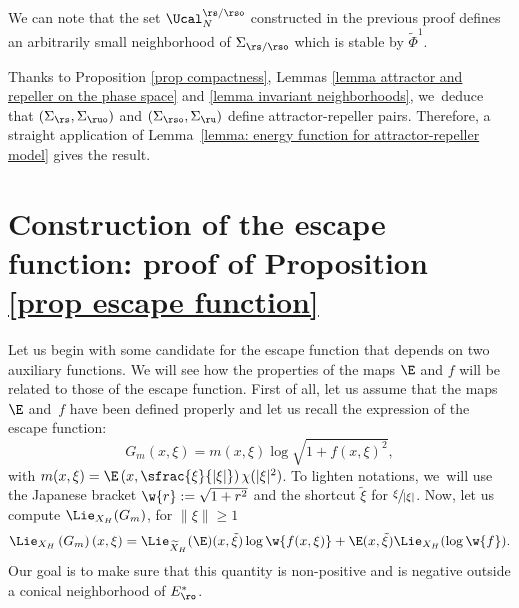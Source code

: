 \begin{remark}
We can note that the set $\Ucal_N^{\rs/\rso}$ constructed in the previous proof defines an arbitrarily small neighborhood of $\Sigma_{\rs/\rso}$ which is stable by $\widetilde{\Phi}^1$.
\end{remark}

\label{subsection: Proof energy functions for the Hamiltonian flow}

Thanks to Proposition \ref{prop compactness}, Lemmas \ref{lemma attractor and repeller on the phase space} and \ref{lemma invariant neighborhoods}, we~deduce that $(\Sigma_{\rs},\Sigma_{\ruo})$ and $(\Sigma_{\rso},\Sigma_{\ru})$ define attractor-repeller pairs. Therefore, a straight application of Lemma~\ref{lemma: energy function for attractor-repeller model} gives the result.

\section{Construction of the escape function: proof of Proposition \ref{prop escape function}}\label{section: Proof of escape function}

Let us begin with some candidate for the escape function that depends on two auxiliary functions. We will see how the properties of the maps $\E$ and $f$ will be related to those of the escape function. First of all, let us assume that the maps~$\E$ and~$f$ have been defined properly and let us recall the expression of the escape function:
\[
G_m (x,\xi) = m(x,\xi) \log \sqrt{1 + f(x,\xi)^2},
\]
with $m(x, \xi) = \E \left(x, \sfrac{\xi}{|\xi|} \right) \chi (|\xi|^2)$. To lighten notations, we~will use the Japanese bracket $\w{r}:= \sqrt{1 + r^2}$ and the shortcut $\tilde{\xi}$ for $\sfrac{\xi}{|\xi|}$. Now, let us compute $\Lie_{X_H} (G_m)$, for $\|\xi\|\geq 1$
\[
\Lie_{X_H} \left(G_m \right) (x,\xi) = \Lie_{\widetilde{X}_H} (\E) (x, \tilde{\xi}) \log \w{f(x,\xi)} + \E (x, \tilde{\xi}) \Lie_{X_H}(\log \w{f}).
\]
Our goal is to make sure that this quantity is non-positive and is negative outside a conical neighborhood of $E_\ro^*$.

